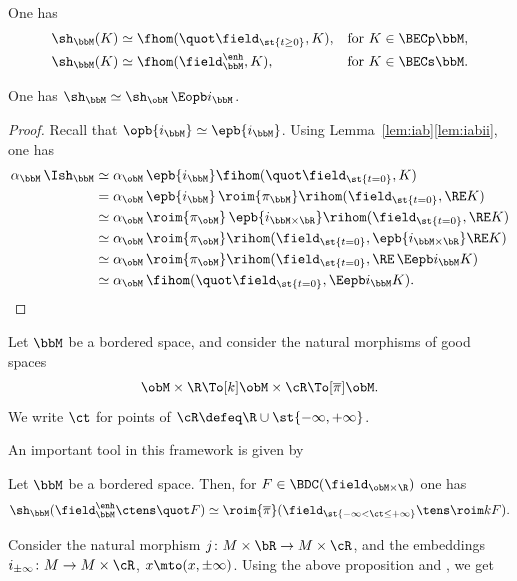One has
\begin{align}
\sh_\bbM(K) &\simeq \fhom(\quot\field_{\st{t\geq0}},K),
&\text{for } K\in\BECp \bbM, \notag \\
\label{eq:shstb}
\sh_\bbM(K) &\simeq \fhom(\field^\enh_\bbM,K),
&\text{for } K\in\BECs \bbM.
\end{align}

\begin{lemma}\label{lem:shi}
One has $\sh_\bbM\simeq \sh_\obM\, \Eopb i_\bbM$.
\end{lemma}

\begin{proof}
Recall that $\opb {i_\bbM}\simeq\epb {i_\bbM}$. Using Lemma~\ref{lem:iab}\eqref{lem:iabii}, one has
\begin{align*}
\alpha_\bbM\,\Ish_\bbM
&\simeq \alpha_\obM\,\epb{i_\bbM} \fihom(\quot\field_{\st{t=0}},K) \\
&= \alpha_\obM\,\epb{i_\bbM}\,\roim{{\pi_\bbM}}\rihom(\field_{\st{t=0}},\RE K) \\
&\simeq \alpha_\obM\,\roim{{\pi_\obM}}\,\epb{i_{\bbM\times\bR}} \rihom(\field_{\st{t=0}},\RE K) \\
&\simeq \alpha_\obM\,\roim{{\pi_\obM}}\rihom(\field_{\st{t=0}},\epb{i_{\bbM\times\bR}}\RE K) \\
&\simeq \alpha_\obM\,\roim{{\pi_\obM}}\rihom(\field_{\st{t=0}},\RE \,\Eepb i_\bbM K) \\
&\simeq \alpha_\obM\,\fihom(\quot\field_{\st{t=0}},\Eepb i_\bbM K).\qedhere
\end{align*}
\end{proof}

Let $\bbM$ be a bordered space, and consider the natural morphisms
of good spaces
\[
\obM\times\R\To[k] \obM\times\cR\To[\overline\pi] \obM.
\]
We write $\ct$ for points of $\cR\defeq \R\cup\st{-\infty,+\infty}$.

An important tool in this framework is given by

\skpt
\begin{proposition}[{\cite[Cor.\,6.6.6]{KS16}}] \label{pro:KScor}
Let $\bbM$ be a bordered space.
Then, for $F \in\BDC(\field_{\obM\times\R})$ one has
\[
\sh_\bbM(\field_\bbM^\enh \ctens \quot F)
\simeq \roim{\overline\pi}(\field_{\st{-\infty<\ct\leq+\infty}}\tens\roim k F).
\]
\end{proposition}

Consider the natural morphism $j\colon M\times\bR\to M\times\cR$, and the embeddings $i_{\pm\infty}\colon M\to M\times\cR$, $x\mto(x,\pm\infty)$.
Using the above proposition and \cite[Prop.\,4.3.10, Lem.\,4.3.13]{DK16}, we get

